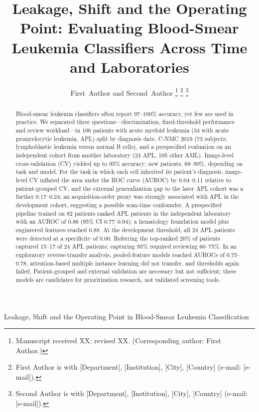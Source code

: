 \documentclass[journal]{IEEEtran}
\begin{document}
\title{Leakage, Shift and the Operating Point: Evaluating Blood-Smear Leukemia Classifiers Across Time and Laboratories}

\author{First~Author and Second~Author%
\thanks{Manuscript received XX; revised XX. (Corresponding author: First Author.)}%
\thanks{First Author is with [Department], [Institution], [City], [Country] (e-mail: [e-mail]).}%
\thanks{Second Author is with [Department], [Institution], [City], [Country] (e-mail: [e-mail]).}}

%
{Leakage, Shift and the Operating Point in Blood-Smear Leukemia Classification}

\maketitle

\begin{abstract}
Blood-smear leukemia classifiers often report 97--100\% accuracy, yet few are used in practice. We separated three questions---discrimination, fixed-threshold performance and review workload---in 106 patients with acute myeloid leukemia (34 with acute promyelocytic leukemia, APL) split by diagnosis date, C-NMC 2019 (73 subjects; lymphoblastic leukemia versus normal B cells), and a prespecified evaluation on an independent cohort from another laboratory (24 APL, 105 other AML). Image-level cross-validation (CV) yielded up to 95\% accuracy; new patients, 69--90\%, depending on task and model. For the task in which each cell inherited its patient's diagnosis, image-level CV inflated the area under the ROC curve (AUROC) by 0.04--0.11 relative to patient-grouped CV, and the external generalization gap to the later APL cohort was a further 0.17--0.24; an acquisition-order proxy was strongly associated with APL in the development cohort, suggesting a possible scan-time confounder. A prespecified pipeline trained on 82 patients ranked APL patients in the independent laboratory with an AUROC of 0.86 (95\% CI 0.77--0.94); a hematology foundation model plus engineered features reached 0.88. At the development threshold, all 24 APL patients were detected at a specificity of 0.00. Referring the top-ranked 20\% of patients captured 15--17 of 24 APL patients; capturing 95\% required reviewing 60--75\%. In an exploratory reverse-transfer analysis, pooled-feature models reached AUROCs of 0.75--0.78, attention-based multiple instance learning did not transfer, and thresholds again failed. Patient-grouped and external validation are necessary but not sufficient; these models are candidates for prioritization research, not validated screening tools.
\end{abstract}
\end{document}
